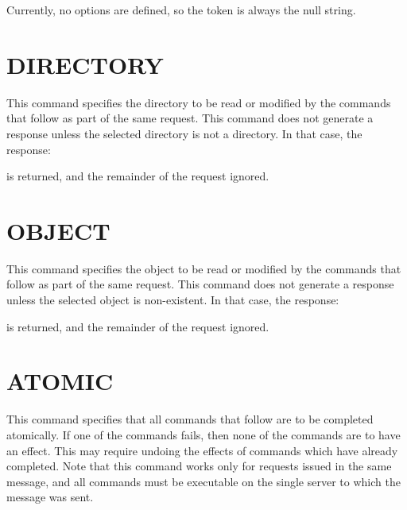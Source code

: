 Currently, no options are defined, so the  token is
always the null string.

\section{DIRECTORY}

\begin{command}
  \commandsize {}  
	\zoos{}\zooe \selectlines
\end{command}


This command specifies the directory to be read or modified by the
commands that follow as part of the same request.  This command
does not generate a response unless the selected directory is not a
directory.  In that case, the response:
\begin{command}
\end{command}
is returned, and the remainder of the request ignored.

\section{OBJECT}

\begin{command}
  \commandsize {}  
	\zoos{}\zooe \selectlines
\end{command}


This command specifies the object to be read or modified by the
commands that follow as part of the same request.  This command
does not generate a response unless the selected object is non-existent.
In that case, the response:
\begin{command}
\end{command}
is returned, and the remainder of the request ignored.

\section{ATOMIC}

\begin{command}
  \commandsize {}
\end{command}

This command specifies that all commands that follow are to be
completed atomically.  If one of the commands fails, then none of the
commands are to have an effect.  This may require undoing the effects
of commands which have already completed.  Note that this command works
only for requests issued in the same message, and all commands must
be executable on the single server to which the message was sent.

